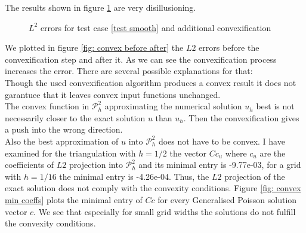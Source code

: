 The results shown in figure \ref{fig: l2 errors test smooth ourMethodConvex} are very disillusioning.
\begin{figure}[H]
\centering
	\caption{$L^2$ errors for test case \ref{test smooth} and additional convexification}
	\label{fig: l2 errors test smooth ourMethodConvex}
\end{figure}
We plotted in figure \ref{fig: convex before after} the $L2$ errors before the convexification step and after it. As we can see the convexification process increases the error. There are several possible explanations for that:\\
Though the used convexification algorithm produces a convex result it does not garantuee that it leaves convex input functions unchanged.\\
The convex function in $\mathcal P^2_h$ approximating the numerical solution $u_h$ best is not necessarily closer to the exact solution $u$ than $u_h$. Then the convexification gives a push into the wrong direction. \\
Also the best approximation of $u$ into $\mathcal P^2_h$ does not have to be convex. I have examined for the triangulation with $h=1/2$ the vector $Cc_u$ where $c_u$ are the coefficients of $L2$ projection into $\mathcal P^2_h$ and its minimal entry is -9.77e-03, for a grid with $h=1/16$ the minimal entry is -4.26e-04. Thus, the $L2$ projection of the exact solution does not comply with the convexity conditions.
Figure \ref{fig: convex min coeffs} plots the minimal entry of $Cc$ for every Generalised Poisson solution vector $c$. We see that especially for small grid widths the solutions do not fulfill the convexity conditions. 


